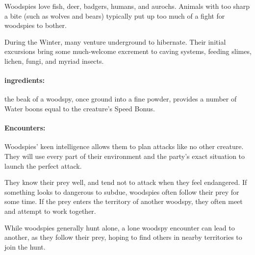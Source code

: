 \begin{multicols}{2}
Woodspies love fish, deer, badgers, humans, and aurochs.
Animals with too sharp a bite (such as wolves and bears) typically put up too much of a fight for woodspies to bother.

During the Winter, many venture underground to hibernate.
Their initial excursions bring some much-welcome excrement to caving systems, feeding slimes, lichen, fungi, and myriad insects.

\paragraph{\Glspl{ingredient}:}
the beak of a woodspy, once ground into a fine powder, provides a number of Water \glspl{boon} equal to the creature's Speed Bonus.

\paragraph{Encounters:} Woodspies' keen intelligence allows them to plan attacks like no other creature.
They will use every part of their environment and the party's exact situation to launch the perfect attack.

They know their prey well, and tend not to attack when they feel endangered.
If something looks to dangerous to subdue, woodspies often follow their prey for some time.
If the prey enters the territory of another woodspy, they often meet and attempt to work together.

While woodspies generally hunt alone, a lone woodspy encounter can lead to another, as they follow their prey, hoping to find others in nearby territories to join the hunt.

\begin{itemize}


\end{itemize}
\end{multicols}
